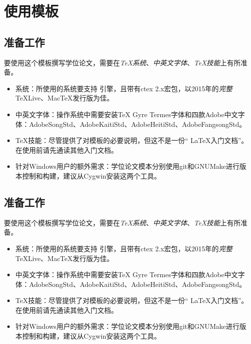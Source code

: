 \section{使用模板}

\subsection{准备工作}
\label{sec:requirements}

要使用这个模板撰写学位论文，需要在\emph{TeX系统}、\emph{中英文字体}、\emph{TeX技能}上有所准备。

\begin{itemize}[noitemsep,topsep=0pt,parsep=0pt,partopsep=0pt]
	\item 系统：所使用的系统要支持 引擎，且带有ctex 2.x宏包，以2015年的\emph{完整}TeXLive、MacTeX发行版为佳。
	\item 中英文字体：操作系统中需要安装TeX Gyre Termes字体和四款Adobe中文字体：AdobeSongStd、AdobeKaitiStd、AdobeHeitiStd、AdobeFangsongStd。
	\item TeX技能：尽管提供了对模板的必要说明，但这不是一份“ \LaTeX 入门文档”。在使用前请先通读其他入门文档。
	\item 针对Windows用户的额外需求：学位论文模本分别使用git和GNUMake进行版本控制和构建，建议从Cygwin安装这两个工具。
\end{itemize}

\subsection{准备工作}
\label{sec:requirements}

要使用这个模板撰写学位论文，需要在\emph{TeX系统}、\emph{中英文字体}、\emph{TeX技能}上有所准备。

\begin{itemize}[noitemsep,topsep=0pt,parsep=0pt,partopsep=0pt]
	\item 系统：所使用的系统要支持 引擎，且带有ctex 2.x宏包，以2015年的\emph{完整}TeXLive、MacTeX发行版为佳。
	\item 中英文字体：操作系统中需要安装TeX Gyre Termes字体和四款Adobe中文字体：AdobeSongStd、AdobeKaitiStd、AdobeHeitiStd、AdobeFangsongStd。
	\item TeX技能：尽管提供了对模板的必要说明，但这不是一份“ \LaTeX 入门文档”。在使用前请先通读其他入门文档。
	\item 针对Windows用户的额外需求：学位论文模本分别使用git和GNUMake进行版本控制和构建，建议从Cygwin安装这两个工具。
\end{itemize}

